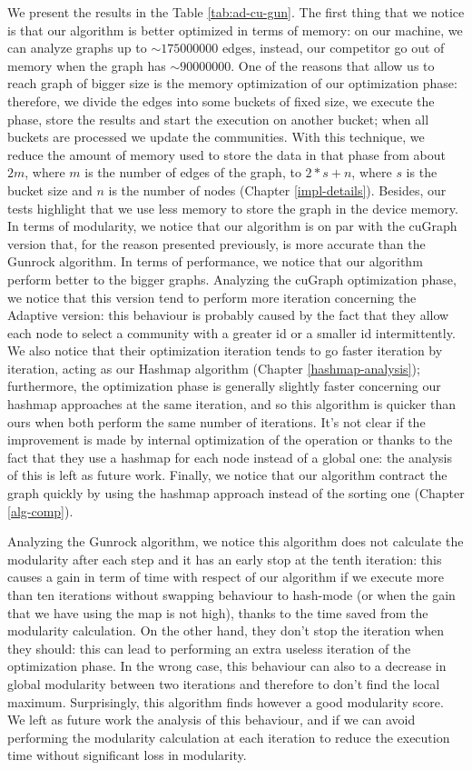 We present the results in the Table \ref{tab:ad-cu-gun}. The first thing that we notice is that our algorithm is better optimized in terms of memory: on our machine, we can analyze graphs up to $\sim 175 000 000$ edges, instead, our competitor go out of memory when the graph has $\sim 90 000 000$. One of the reasons that allow us to reach graph of bigger size is the memory optimization of our optimization phase: therefore, we divide the edges into some buckets of fixed size, we execute the phase, store the results and start the execution on another bucket; when all buckets are processed we update the communities. With this technique, we reduce the amount of memory used to store the data in that phase from about $2m$, where $m$ is the number of edges of the graph, to $2 * s + n$, where $s$ is the bucket size and $n$ is the number of nodes (Chapter \ref{impl-details}). Besides, our tests highlight that we use less memory to store the graph in the device memory. \\
In terms of modularity, we notice that our algorithm is on par with the cuGraph version that, for the reason presented previously, is more accurate than the Gunrock algorithm. In terms of performance, we notice that our algorithm perform better to the bigger graphs. Analyzing the cuGraph optimization phase, we notice that this version tend to perform more iteration concerning the Adaptive version: this behaviour is probably caused by the fact that they allow each node to select a community with a greater id or a smaller id intermittently.
We also notice that their optimization iteration tends to go faster iteration by iteration, acting as our Hashmap algorithm (Chapter \ref{hashmap-analysis}); furthermore, the optimization phase is generally slightly faster concerning our hashmap approaches at the same iteration, and so this algorithm is quicker than ours when both perform the same number of iterations. It's not clear if the improvement is made by internal optimization of the operation or thanks to the fact that they use a hashmap for each node instead of a global one: the analysis of this is left as future work. Finally, we notice that our algorithm contract the graph quickly by using the hashmap approach instead of the sorting one (Chapter \ref{alg-comp}).


Analyzing the Gunrock algorithm, we notice this algorithm does not calculate the modularity after each step and it has an early stop at the tenth iteration: this causes a gain in term of time with respect of our algorithm if we execute more than ten iterations without swapping behaviour to hash-mode (or when the gain that we have using the map is not high), thanks to the time saved from the modularity calculation. On the other hand, they don't stop the iteration when they should: this can lead to performing an extra useless iteration of the optimization phase. In the wrong case, this behaviour can also to a decrease in global modularity between two iterations and therefore to don't find the local maximum. Surprisingly, this algorithm finds however a good modularity score. We left as future work the analysis of this behaviour, and if we can avoid performing the modularity calculation at each iteration to reduce the execution time without significant loss in modularity. 


